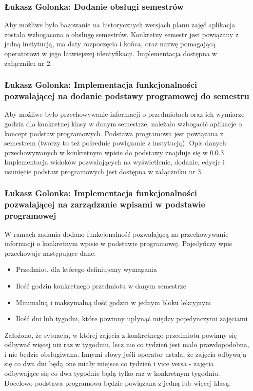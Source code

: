 \documentclass[12pt,a4paper,oneside]{article}
\theoremstyle{definition}
\numberwithin{equation}{section}
\begin{document}
\subsubsection{Łukasz Golonka: Dodanie obsługi semestrów}
Aby możliwe było bazowanie na historycznych wersjach planu zajęć aplikacja została wzbogacona o obsługę semestrów.
Konkretny semestr jest powiązany z jedną instytucją, ma daty rozpoczęcia i końca, oraz nazwę pomagającą operatorowi w jego łatwiejszej identyfikacji.
Implementacja dostępna w załączniku nr 2.
\subsubsection{Łukasz Golonka: Implementacja funkcjonalności pozwalającej na dodanie podstawy programowej do semestru}
Aby możliwe było przechowywanie informacji o przedmiotach oraz ich wymiarze godzin dla konkretnej klasy w danym semestrze, należało wzbogacić aplikacje o koncept podstaw programowych.
Podstawa programowa jest powiązana z semestrem (tworzy to też pośrednie powiązanie z instytucją).
Opis danych przechowywanych w konkretnym wpisie do podstawy znajduje się w \ref{plan_entry_desc}
Implementacja widoków pozwalających na wyświetlenie, dodanie, edycje i usunięcie podstaw programowych jest dostępna w załączniku nr 3.
\subsubsection{Łukasz Golonka: Implementacja funkcjonalności pozwalającej na zarządzanie wpisami w podstawie programowej} \label{plan_entry_desc}
W ramach zadania dodano funkcjonalność pozwalającą na przechowywanie informacji o konkretnym wpisie w podstawie programowej.
Pojedyńczy wpis przechowuje następujące dane:
\begin{itemize}
	\item Przedmiot, dla którego definiujemy wymagania
	\item Ilość godzin konkretnego przedmiotu w danym semestrze
	\item Minimalną i maksymalną ilość godzin w jednym bloku lekcyjnym
	\item Ilość dni lub tygodni, które powinny upłynąć między pojedynczymi zajęciami
\end{itemize}
Założono, że sytuacja, w której zajęcia  z konkretnego przedmiotu powinny się odbywać więcej niż raz w tygodniu, lecz nie co tydzień jest mało prawdopodobna, i nie będzie obsługiwana.
Innymi słowy jeśli operator ustala, że  zajęcia odbywają się co dwa dni będą one miały miejsce co tydzień i vice versa - zajęcia odbywające się co dwa tygodnie będą tylko raz w konkretnym tygodniu.
Docelowo podstawa programowa będzie powiązana z jedną lub więcej klasą.
\end{document}
